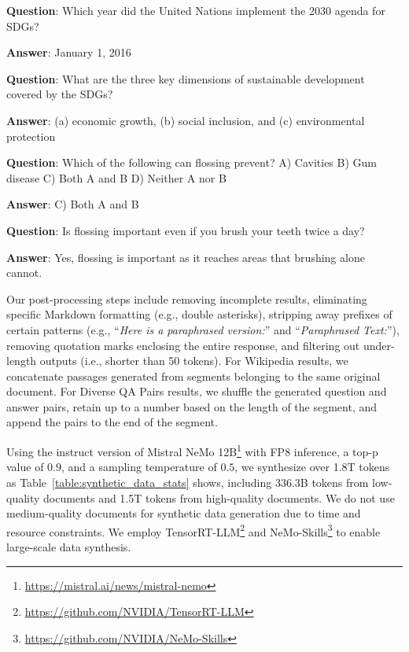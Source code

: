 \documentclass[11pt]{article}
\begin{document}
\begin{tcolorbox}[boxsep=0mm,left=1mm,right=1mm,top=1mm,bottom=1mm,fontupper=\small\ttfamily,halign=left,arc=0mm,boxrule=1pt,colback=gray!10]
\textbf{Question}: Which year did the United Nations implement the 2030 agenda for SDGs?

\textbf{Answer}: January 1, 2016

\vspace{4pt}

\textbf{Question}: What are the three key dimensions of sustainable development covered by the SDGs?

\textbf{Answer}: (a) economic growth, (b) social inclusion, and (c) environmental protection

\vspace{4pt}

\textbf{Question}: Which of the following can flossing prevent? A) Cavities B) Gum disease C) Both A and B D) Neither A nor B

\textbf{Answer}: C) Both A and B

\vspace{4pt}

\textbf{Question}: Is flossing important even if you brush your teeth twice a day?

\textbf{Answer}: Yes, flossing is important as it reaches areas that brushing alone cannot.
\end{tcolorbox}
\noindent\begin{minipage}{\linewidth}
\end{minipage}

Our post-processing steps include removing incomplete results, eliminating specific Markdown formatting (e.g., double asterisks), stripping away prefixes of certain patterns (e.g., ``\textit{Here is a paraphrased version:}'' and ``\textit{Paraphrased Text:}''), removing quotation marks enclosing the entire response, and filtering out under-length outputs (i.e., shorter than 50 tokens).
For \textrm{Wikipedia} results, we concatenate passages generated from segments belonging to the same original document.
For \textrm{Diverse QA Pairs} results, we shuffle the generated question and answer pairs, retain up to a number based on the length of the segment, and append the pairs to the end of the segment.

Using the instruct version of Mistral NeMo 12B\footnote{\url{https://mistral.ai/news/mistral-nemo}} with FP8 inference, a top-p value of $0.9$, and a sampling temperature of $0.5$, we synthesize over 1.8T tokens as Table~\ref{table:synthetic_data_stats} shows, including 336.3B tokens from low-quality documents and 1.5T tokens from high-quality documents.  We do not use medium-quality documents for synthetic data generation due to time and resource constraints. We employ TensorRT-LLM\footnote{\url{https://github.com/NVIDIA/TensorRT-LLM}} and NeMo-Skills\footnote{\url{https://github.com/NVIDIA/NeMo-Skills}} to enable large-scale data synthesis.
\end{document}
